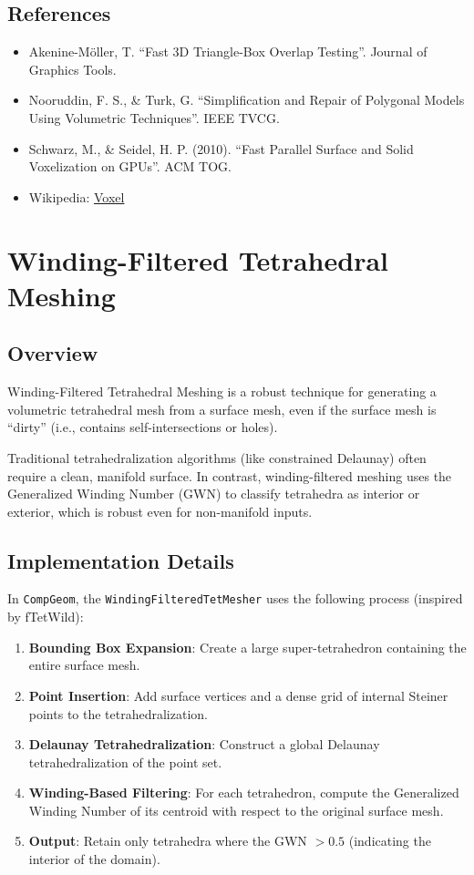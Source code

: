 \subsection{References}
\begin{itemize}
\item Akenine-M\"oller, T. \cite{akeninemoller2001} ``Fast 3D Triangle-Box Overlap Testing''. Journal of Graphics Tools.
\item Nooruddin, F. S., \& Turk, G. \cite{nooruddin2003} ``Simplification and Repair of Polygonal Models Using Volumetric Techniques''. IEEE TVCG.
\item Schwarz, M., \& Seidel, H. P. (2010). ``Fast Parallel Surface and Solid Voxelization on GPUs''. ACM TOG.
\item Wikipedia: \href{https://en.wikipedia.org/wiki/Voxel}{Voxel}
\end{itemize}

\section{Winding-Filtered Tetrahedral Meshing}
\label{sec:winding_filtered_tet_meshing}

\subsection{Overview}
Winding-Filtered Tetrahedral Meshing is a robust technique for generating a volumetric tetrahedral mesh from a surface mesh, even if the surface mesh is ``dirty'' (i.e., contains self-intersections or holes)\cite{hu2018}.

Traditional tetrahedralization algorithms (like constrained Delaunay) often require a clean, manifold surface. In contrast, winding-filtered meshing uses the Generalized Winding Number (GWN) to classify tetrahedra as interior or exterior, which is robust even for non-manifold inputs.

\subsection{Implementation Details}
In \texttt{CompGeom}, the \texttt{WindingFilteredTetMesher} uses the following process (inspired by fTetWild\cite{hu2018}):
\begin{enumerate}
\item \textbf{Bounding Box Expansion}: Create a large super-tetrahedron containing the entire surface mesh.
\item \textbf{Point Insertion}: Add surface vertices and a dense grid of internal Steiner points to the tetrahedralization.
\item \textbf{Delaunay Tetrahedralization}: Construct a global Delaunay tetrahedralization of the point set.
\item \textbf{Winding-Based Filtering}: For each tetrahedron, compute the Generalized Winding Number of its centroid with respect to the original surface mesh.
\item \textbf{Output}: Retain only tetrahedra where the GWN $> 0.5$ (indicating the interior of the domain).
\end{enumerate}

